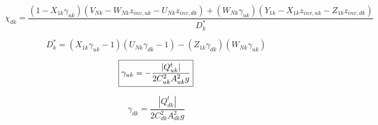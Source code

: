 \documentclass[11pt]{article}
\begin{document}
\begin{equation}
  \boxed{
  \chi_{dk} = \frac{(1 - X_{1k} \gamma_{uk})(V_{Nk} - W_{Nk} z_{inv, uk} - U_{Nk} z_{inv, dk})  + (W_{Nk} \gamma_{uk})(Y_{1k} - X_{1k} z_{inv, uk} - Z_{1k} z_{inv, dk})}{D_k^*}
  }
\end{equation}

\begin{equation}
  \boxed{
  D_k^* = (X_{1k} \gamma_{uk} - 1)(U_{Nk} \gamma_{dk} - 1) - (Z_{1k} \gamma_{dk})(W_{Nk} \gamma_{uk})
  }
\end{equation}

\begin{equation}
  \boxed{
  \gamma_{uk} = -\frac{|Q_{uk}^{t}|}{2 C_{uk}^2 A_{uk}^2 g} \\
  }
\end{equation}

\begin{equation}
  \boxed{
  \gamma_{dk} = \frac{|Q_{dk}^{t}|}{2 C_{dk}^2 A_{dk}^2 g}
  }
\end{equation}







\end{document}
